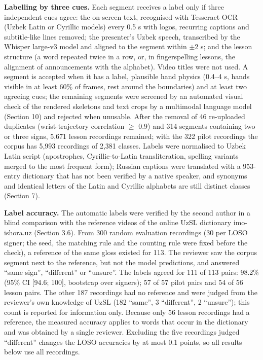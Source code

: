 \documentclass[a4paper,fleqn]{cas-dc}
\begin{document}
\textbf{Labelling by three cues.} Each segment receives a label only if three independent cues agree: the on-screen text, recognised with Tesseract OCR \cite{2007_smith_tesseract} (Uzbek Latin or Cyrillic models) every 0.5 s with logos, recurring captions and subtitle-like lines removed; the presenter's Uzbek speech, transcribed by the Whisper large-v3 model \cite{2023_radford_whisper} and aligned to the segment within $\pm$2 s; and the lesson structure (a word repeated twice in a row, or, in fingerspelling lessons, the alignment of announcements with the alphabet). Video titles were not used. A segment is accepted when it has a label, plausible hand physics (0.4--4 s, hands visible in at least 60\% of frames, rest around the boundaries) and at least two agreeing cues; the remaining segments were screened by an automated visual check of the rendered skeletons and text crops by a multimodal language model (Section 10) and rejected when unusable. After the removal of 46 re-uploaded duplicates (wrist-trajectory correlation $\geq$ 0.9) and 314 segments containing two or three signs, 5,671 lesson recordings remained; with the 322 pilot recordings the corpus has 5,993 recordings of 2,381 classes. Labels were normalised to Uzbek Latin script (apostrophes, Cyrillic-to-Latin transliteration, spelling variants merged to the most frequent form); Russian captions were translated with a 953-entry dictionary that has not been verified by a native speaker, and synonyms and identical letters of the Latin and Cyrillic alphabets are still distinct classes (Section 7).

\textbf{Label accuracy.} The automatic labels were verified by the second author in a blind comparison with the reference videos of the online UzSL dictionary imo-ishora.uz (Section 3.6). From 300 random evaluation recordings (30 per LOSO signer; the seed, the matching rule and the counting rule were fixed before the check), a reference of the same gloss existed for 113. The reviewer saw the corpus segment next to the reference, but not the model predictions, and answered ``same sign'', ``different'' or ``unsure''. The labels agreed for 111 of 113 pairs: 98.2\% (95\% CI {[}94.6; 100{]}, bootstrap over signers); 57 of 57 pilot pairs and 54 of 56 lesson pairs. The other 187 recordings had no reference and were judged from the reviewer's own knowledge of UzSL (182 ``same'', 3 ``different'', 2 ``unsure''); this count is reported for information only. Because only 56 lesson recordings had a reference, the measured accuracy applies to words that occur in the dictionary and was obtained by a single reviewer. Excluding the five recordings judged ``different'' changes the LOSO accuracies by at most 0.1 points, so all results below use all recordings.
\end{document}
